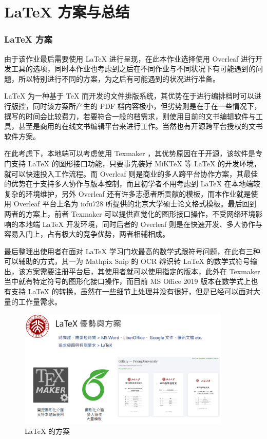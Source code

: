 \chapter{LaTeX 方案与总结}
\label{chap:3}

\subsection{LaTeX 方案}

由于该作业最后需要使用 LaTeX 进行呈现，在此本作业选择使用 Overleaf 进行开发工具的选项，同时本作业也考虑到之后在不同作业与不同状况下有可能遇到的问题，所以特别进行不同的方案，为之后有可能遇到的状况进行准备。

LaTeX 为一种基于 TeX 而开发的文件排版系统，其优势在于进行编排档时可以进行版控，同时该方案所产生的 PDF 档内容极小，但劣势则是在于在一些情况下，撰写的时间会比较费力，若要符合一般的档需求，则使用目前的文书编辑软件与工具，甚至是商用的在线文书编辑平台来进行工作。当然也有开源跨平台授权的文书软件方案。

在此考虑下，本地端可以考虑使用 Texmaker ，其优势原因在于开源，该软件是专门支持 LaTeX 的图形接口功能，只要事先装好 MiKTeX 等 LaTeX 的开发环境，就可以快速投入工作流程。而 Overleaf 则是商业的多人跨平台协作方案，其最佳的优势在于支持多人协作与版本控制，而且初学者不用考虑到 LaTeX 在本地端较复杂的环境维护，另外 Overleaf 还有许多志愿者所贡献的模板，而本作业就是使用 Overleaf 平台上名为  iofu728 所提供的北京大学硕士论文格式模板。最后回到两者的方案上，前者 Texmaker 可以提供直觉化的图形接口操作，不受网络环境影响的本地端 LaTeX 开发环境，同时后者的 Overleaf 则是在快速开发、多人协作与容易入门上，占有极大的竞争优势，两者相辅相成。

最后整理出使用者在面对 LaTeX 学习门坎最高的数学式跟符号问题，在此有三种可以辅助的方式，其一为 Mathpix Snip 的 OCR 辨识转 LaTeX 的数学式符号输出，该方案需要注册平台后，其使用者就可以使用指定的版本，此外在 Texmaker 当中就有特定符号的图形化接口操作，而目前 MS Office 2019 版本在数学式上也有支持 LaTeX 的转换，虽然在一些细节上处理并没有很好，但是已经可以面对大量的工作量需求。


\begin{figure}[htb]
\centering 
\includegraphics[width=0.90\textwidth]{img/c3m0.png} 
\caption{LaTeX 的方案}
\label{Test}
\end{figure}

